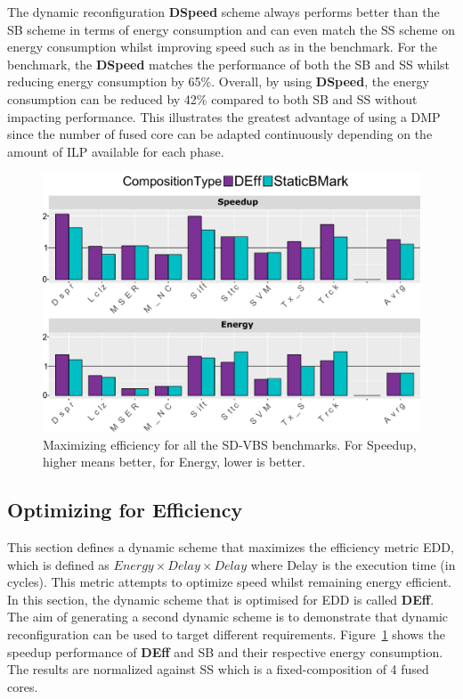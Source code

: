 The dynamic reconfiguration \textbf{DSpeed} scheme always performs better than the SB scheme in terms of energy consumption and can even match the SS scheme on energy consumption whilst improving speed such as in the  benchmark.
For the  benchmark, the \textbf{DSpeed} matches the performance of both the SB and SS whilst reducing energy consumption by 65\%.
Overall, by using \textbf{DSpeed}, the energy consumption can be reduced by 42\% compared to both SB and SS without impacting performance.
This illustrates the greatest advantage of using a DMP since the number of fused core can be adapted continuously depending on the amount of ILP available for each phase.


\begin{figure}[t]
    \centering
    \includegraphics[width=1\textwidth]{cases-paper/graphics/results/edd_bars2.pdf}
    \caption{Maximizing efficiency for all the SD-VBS benchmarks. For Speedup, higher means better, for Energy, lower is better.}
    \label{fig:effres}
	\vspace{1em}
\end{figure}

\subsection{Optimizing for Efficiency}

This section defines a dynamic scheme that maximizes the efficiency metric EDD, which is defined as $Energy \times Delay \times Delay$ where Delay is the execution time (in cycles).
This metric attempts to optimize speed whilst remaining energy efficient.
In this section, the dynamic scheme that is optimised for EDD is called \textbf{DEff}.
The aim of generating a second dynamic scheme is to demonstrate that dynamic reconfiguration can be used to target different requirements.
Figure~\ref{fig:effres} shows the speedup performance of \textbf{DEff} and SB and their respective energy consumption.
The results are normalized against SS which is a fixed-composition of 4 fused cores.

